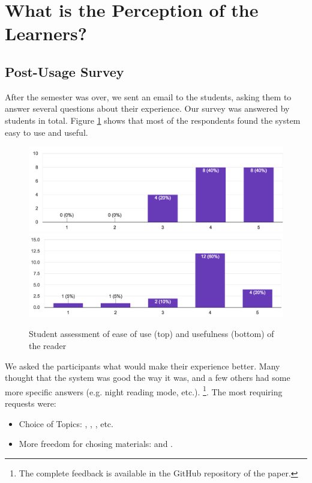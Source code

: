 
\section{What is the Perception of the Learners?}
\label{sec:perception}

\subsection{Post-Usage Survey}

After the semester was over, we sent an email to the students, asking them to answer several questions about their experience. Our survey was answered by \surveyrespondents students in total. Figure \ref{fig:reader_use} shows that most of the respondents found the system easy to use and useful. 

 \begin{figure}[h!]
    \centering
      \includegraphics[width=0.8\columnwidth]{figures/opinions/reader_ease_of_use}
      \includegraphics[width=0.8\columnwidth]{figures/opinions/reader_usefulness}
      \caption{Student assessment of ease of use (top) and usefulness (bottom) of the reader}
      \label{fig:reader_use}
    \end{figure}

We asked the participants what would make their experience better. Many thought that the system was good the way it was, and a few others had some more specific answers (e.g. night reading mode, etc.). \footnote{The complete feedback is available in the GitHub repository of the paper.}. The most requiring requests were: 

\begin{itemize}
	\item Choice of Topics: 
		, 
		, 
		, etc.
	\item More freedom for chosing materials: 
		 and 
		. 
\end{itemize}

